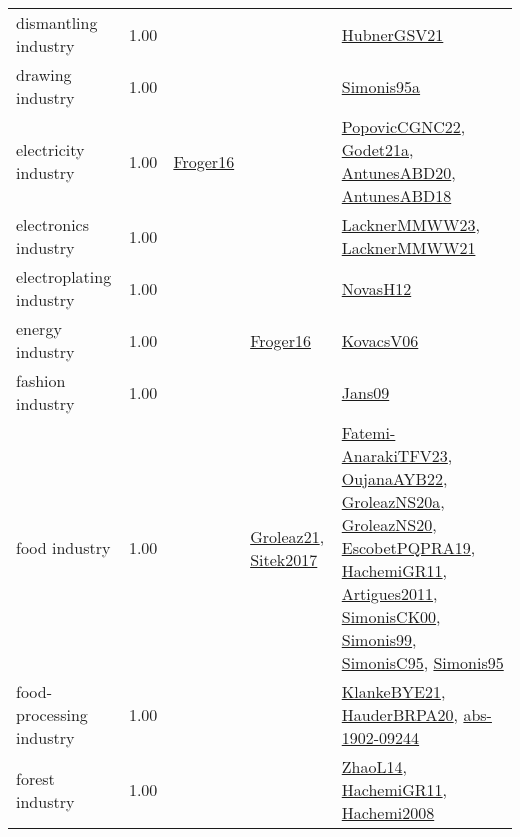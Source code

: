 {\begin{longtable}{p{3cm}r>{\raggedright\arraybackslash}p{6cm}>{\raggedright\arraybackslash}p{6cm}>{\raggedright\arraybackslash}p{8cm}}
\index{dismantling industry}\index{Industries!dismantling industry}dismantling industry &  1.00 &  &  & \hyperref[detail:HubnerGSV21]{HubnerGSV21}\\
\index{drawing industry}\index{Industries!drawing industry}drawing industry &  1.00 &  &  & \hyperref[detail:Simonis95a]{Simonis95a}\\
\index{electricity industry}\index{Industries!electricity industry}electricity industry &  1.00 & \hyperref[detail:Froger16]{Froger16} &  & \hyperref[detail:PopovicCGNC22]{PopovicCGNC22}, \hyperref[detail:Godet21a]{Godet21a}, \hyperref[detail:AntunesABD20]{AntunesABD20}, \hyperref[detail:AntunesABD18]{AntunesABD18}\\
\index{electronics industry}\index{Industries!electronics industry}electronics industry &  1.00 &  &  & \hyperref[detail:LacknerMMWW23]{LacknerMMWW23}, \hyperref[detail:LacknerMMWW21]{LacknerMMWW21}\\
\index{electroplating industry}\index{Industries!electroplating industry}electroplating industry &  1.00 &  &  & \hyperref[detail:NovasH12]{NovasH12}\\
\index{energy industry}\index{Industries!energy industry}energy industry &  1.00 &  & \hyperref[detail:Froger16]{Froger16} & \hyperref[detail:KovacsV06]{KovacsV06}\\
\index{fashion industry}\index{Industries!fashion industry}fashion industry &  1.00 &  &  & \hyperref[detail:Jans09]{Jans09}\\
\index{food industry}\index{Industries!food industry}food industry &  1.00 &  & \hyperref[detail:Groleaz21]{Groleaz21}, \hyperref[detail:Sitek2017]{Sitek2017} & \hyperref[detail:Fatemi-AnarakiTFV23]{Fatemi-AnarakiTFV23}, \hyperref[detail:OujanaAYB22]{OujanaAYB22}, \hyperref[detail:GroleazNS20a]{GroleazNS20a}, \hyperref[detail:GroleazNS20]{GroleazNS20}, \hyperref[detail:EscobetPQPRA19]{EscobetPQPRA19}, \hyperref[detail:HachemiGR11]{HachemiGR11}, \hyperref[detail:Artigues2011]{Artigues2011}, \hyperref[detail:SimonisCK00]{SimonisCK00}, \hyperref[detail:Simonis99]{Simonis99}, \hyperref[detail:SimonisC95]{SimonisC95}, \hyperref[detail:Simonis95]{Simonis95}\\
\index{food-processing industry}\index{Industries!food-processing industry}food-processing industry &  1.00 &  &  & \hyperref[detail:KlankeBYE21]{KlankeBYE21}, \hyperref[detail:HauderBRPA20]{HauderBRPA20}, \hyperref[detail:abs-1902-09244]{abs-1902-09244}\\
\index{forest industry}\index{Industries!forest industry}forest industry &  1.00 &  &  & \hyperref[detail:ZhaoL14]{ZhaoL14}, \hyperref[detail:HachemiGR11]{HachemiGR11}, \hyperref[detail:Hachemi2008]{Hachemi2008}\\

\end{longtable}}
